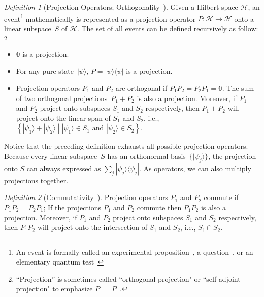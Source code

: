 \documentclass{article}
\theoremstyle{remark}
\newtheorem{definition}{Definition}
\newcommand{\Hilb}{\mathcal{H}}
\newcommand{\ket}[1]{|#1\rangle}
\newcommand{\proj}[1]{|#1 \rangle\langle #1 |}
\newcommand{\yutsung}[1]{\fbox{\begin{minipage}{0.9\textwidth}\color{purple}{Yu-Tsung says: #1}\end{minipage}}}
\newcommand{\amr}[1]{\fbox{\begin{minipage}{0.9\textwidth}\color{green}{Amr says: #1}\end{minipage}}}
\begin{document}
\begin{definition}[Projection Operators; Orthogonality~\cite{10.2307/2308516,Redhead1987-REDINA,peres1995quantum,Swart2013}]
\label{def:Projection} Given a Hilbert space $\Hilb$, an event\footnote{An event
is formally called an experimental proposition~\cite{BirkhoffVonNeumann1936}, a question~\cite{10.2307/2308516,DBLP:journals/corr/abs-0910-2393}, or an
elementary quantum test~\cite{peres1995quantum}} mathematically is represented as a projection operator $P:\Hilb\rightarrow\Hilb$ onto a linear subspace~$S$ of $\Hilb$. The set of all
events can be defined recursively as follow:
\footnote {``Projection'' is sometimes called
``orthogonal projection" or ``self-adjoint projection" to
emphasize $P^{\dagger} = P$~\cite{Maassen2010}.}
\begin{itemize}
\item $\mathbb{0}$ is a projection.
\item For any pure state~$\ket{\psi}$, $P=\proj{\psi}$ is a projection. 
\item Projection operators $P_1$ and $P_2$ are orthogonal if $P_1P_2 =
  P_2P_1 = \mathbb{0}$. The sum of two orthogonal projections~$P_1 +
  P_2$ is also a projection. Moreover, if $P_1$ and $P_2$ project onto
  subspaces $S_1$ and $S_2$ respectively, then $P_1 + P_2$ will project onto the
  linear span of $S_1$ and $S_2$, i.e., $\left\{\ket{\psi_1} + \ket{\psi_2}
  \middle| \ket{\psi_1}\in S_1 \textrm{ and } \ket{\psi_2}\in S_2 \right\}$.
\end{itemize}
\end{definition}

Notice that the preceding definition exhausts all possible projection operators.
Because every linear subspace~$S$ has an orthonormal basis~$\{\ket{\psi_j}\}$,
the projection onto $S$ can always expressed as $\sum_j\proj{\psi_j}$.
As operators, we can also multiply projections together. 

\begin{definition}[Commutativity~\cite{peres1995quantum}]
Projection operators $P_1$ and $P_2$ commute if $P_1P_2 =
  P_2P_1$;
If the projections $P_1$ and $P_2$ commute then $P_1P_2$ is also
  a projection. Moreover, if $P_1$ and $P_2$ project onto
  subspaces $S_1$ and $S_2$ respectively, then $P_1P_2$ will project onto the
  intersection of $S_1$ and $S_2$, i.e., $S_1 \cap S_2$.
\end{definition}

\end{document}
